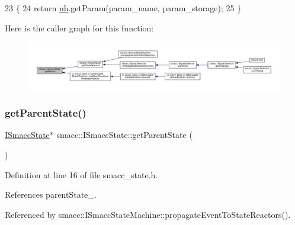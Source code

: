 \begin{DoxyCode}
23 \{
24     \textcolor{keywordflow}{return} \hyperlink{classsmacc_1_1ISmaccState_a13fe6e6abfdb87996402189d44b78494}{nh}.getParam(param\_name, param\_storage);
25 \}
\end{DoxyCode}
Here is the caller graph for this function\+:
\nopagebreak
\begin{figure}[H]
\begin{center}
\leavevmode
\includegraphics[width=350pt]{classsmacc_1_1ISmaccState_abbb3a24b912c6e8de28f7b86123b6357_icgraph}
\end{center}
\end{figure}
\mbox{\label{classsmacc_1_1ISmaccState_a3484b4a32ef47a8650f08df67de4fae5}} 
\subsubsection{\texorpdfstring{get\+Parent\+State()}{getParentState()}}
{\footnotesize\ttfamily \hyperlink{classsmacc_1_1ISmaccState}{I\+Smacc\+State}$\ast$ smacc\+::\+I\+Smacc\+State\+::get\+Parent\+State (\begin{DoxyParamCaption}{ }\end{DoxyParamCaption})\hspace{0.3cm}{\ttfamily [inline]}}



Definition at line 16 of file smacc\+\_\+state.\+h.



References parent\+State\+\_\+.



Referenced by smacc\+::\+I\+Smacc\+State\+Machine\+::propagate\+Event\+To\+State\+Reactors().


